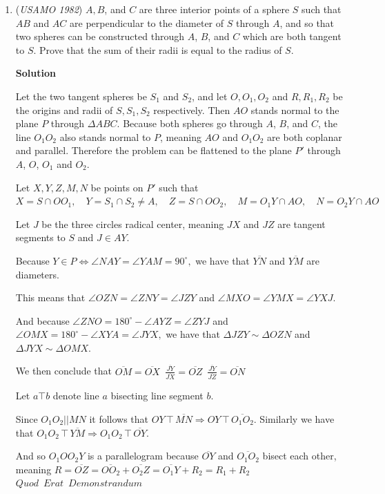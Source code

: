 \begin{enumerate}
 And $k>>3,5,17,257,65537,6700417,641$ so the relevant values will, in fact, always be composite. $\blacksquare$



	\item (\textit{USAMO 1982}) $A,B$, and $C$ are three interior points of a sphere $S$ such that $AB$ and $AC$ are perpendicular to the diameter of $S$ through $A$, and so that two spheres can be constructed through $A$, $B$, and $C$ which are both tangent to $S$. Prove that the sum of their radii is equal to the radius of $S$.


 



\textbf{Solution}

Let the two tangent spheres be $S_1$ and $S_2$, and let $O, O_1, O_2$ and $R, R_1, R_2$ be the origins and radii of $S, S_1, S_2$ respectively. Then $AO$ stands normal to the plane $P$ through $\Delta ABC$. Because both spheres go through $A$, $B$, and $C$, the line $O_1 O_2$ also stands normal to $P$, meaning $AO$ and $O_1 O_2$ are both coplanar and parallel. Therefore the problem can be flattened to the plane $P'$ through $A$, $O$, $O_1$ and $O_2$. 

 
Let $X, Y, Z, M, N$ be points on $P'$ such that $X = S \cap O O_1,  \quad Y = S_1 \cap S_2 \neq A,  \quad   Z = S \cap O O_2,   \quad  M = O_1 Y \cap AO,    \quad N = O_2 Y \cap AO$ 

 Let $J$ be the three circles radical center, meaning $JX$ and $JZ$ are tangent segments to $S$ and $J \in AY$.

 
Because  $Y \in P \iff \angle NAY = \angle YAM = 90 ^{\circ},$ we have that $\overline{YN}$ and $\overline{YM}$ are diameters. 

 This means that $\angle OZN = \angle ZNY = \angle JZY$ and $\angle MXO = \angle YMX= \angle YXJ$. 

 And because $\angle ZNO = 180^{\circ} - \angle AYZ = \angle ZYJ$ and $\angle OMX = 180^{\circ} -\angle XYA = \angle JYX,$ we have that $\Delta JZY \sim \Delta OZN$ and $\Delta JYX \sim \Delta OMX$. 

 We then conclude that $\overline{OM} = \overline{OX} \enspace \frac {\overline{JY} }{ \overline{JX}}  = \overline{OZ} \enspace \frac {\overline{JY} }{ \overline{JZ}}  = \overline{ON}$

 
Let $a \top b$ denote line $a$ bisecting line segment $b$.

 Since $O_1 O_2 || MN$ it follows that $OY \, \top \, \overline{MN} \Rightarrow OY \, \top \,  \overline{O_1 O_2}$. Similarly we have that $O_1 O_2 \, \top \, \overline{YM} \Rightarrow O_1 O_2 \, \top \,  \overline{OY}$.

 And so $O_1 O O_2 Y$ is a parallelogram because $\overline{OY}$ and $\overline{O_1 O_2}$ bisect each other, meaning $R = \overline{OZ} = \overline{O O_2} + \overline{O_2 Z} = \overline{O_1 Y}+ R_2 = R_1 + R_2$
$Quod \enspace Erat \enspace Demonstrandum$



\end{enumerate}